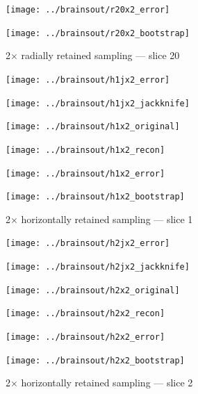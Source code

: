 \documentclass[article]{jdssv}
\begin{document}
\begin{appendix}
\begin{figure}
\begin{centering}
\parbox{\imsize}{\texttt{[image: ../brainsout/r20x2\_error]}}
\parbox{\imsize}{\texttt{[image: ../brainsout/r20x2\_bootstrap]}}

\end{centering}
\caption{2$\times$ radially retained sampling --- slice 20}
\end{figure}


\begin{figure}
\begin{centering}

\parbox{\imsize}{\texttt{[image: ../brainsout/h1jx2\_error]}}
\parbox{\imsize}{\texttt{[image: ../brainsout/h1jx2\_jackknife]}}

\vspace{\vertsep}

\parbox{\imsize}{\texttt{[image: ../brainsout/h1x2\_original]}}
\parbox{\imsize}{\texttt{[image: ../brainsout/h1x2\_recon]}}

\vspace{\vertsep}

\parbox{\imsize}{\texttt{[image: ../brainsout/h1x2\_error]}}
\parbox{\imsize}{\texttt{[image: ../brainsout/h1x2\_bootstrap]}}

\end{centering}
\caption{2$\times$ horizontally retained sampling --- slice 1}
\end{figure}


\begin{figure}
\begin{centering}

\parbox{\imsize}{\texttt{[image: ../brainsout/h2jx2\_error]}}
\parbox{\imsize}{\texttt{[image: ../brainsout/h2jx2\_jackknife]}}

\vspace{\vertsep}

\parbox{\imsize}{\texttt{[image: ../brainsout/h2x2\_original]}}
\parbox{\imsize}{\texttt{[image: ../brainsout/h2x2\_recon]}}

\vspace{\vertsep}

\parbox{\imsize}{\texttt{[image: ../brainsout/h2x2\_error]}}
\parbox{\imsize}{\texttt{[image: ../brainsout/h2x2\_bootstrap]}}

\end{centering}
\caption{2$\times$ horizontally retained sampling --- slice 2}
\end{figure}


\begin{figure}
\begin{centering}


\end{centering}
\end{figure}
\end{appendix}
\end{document}
